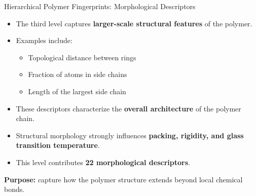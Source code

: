 \documentclass[9pt]{beamer}
\begin{document}
\begin{frame}{Hierarchical Polymer Fingerprints: Morphological Descriptors}

\begin{itemize}
\setlength{\itemsep}{1em}

\item The third level captures \textbf{larger-scale structural features}
of the polymer.

\item Examples include:

\begin{itemize}
\item Topological distance between rings
\item Fraction of atoms in side chains
\item Length of the largest side chain
\end{itemize}

\item These descriptors characterize the \textbf{overall architecture}
of the polymer chain.

\item Structural morphology strongly influences
\textbf{packing, rigidity, and glass transition temperature}.

\item This level contributes \textbf{22 morphological descriptors}.

\end{itemize}

\vspace{0.5em}

\textbf{Purpose:} capture how the polymer structure extends
beyond local chemical bonds.

\end{frame}
\end{document}
